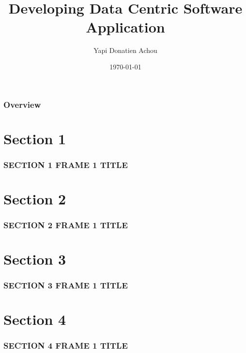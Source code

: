 \documentclass{beamer}
\title[Data management course, USN]{Developing Data Centric Software Application} %
\author{Yapi Donatien Achou} %
\institute[Semcon] %
{
Semcon \\ %
\medskip
\textit{yapi-donatien.achou@semcon.com} %
}
\date{\today} %
\begin{document}
\begin{frame}
\titlepage %
\end{frame}

\begin{frame}
\frametitle{Overview} %
\tableofcontents %
\end{frame}

\section{Section 1} 
\begin{frame}
\frametitle{SECTION 1 FRAME 1 TITLE}
\end{frame}




\section{Section 2}
\begin{frame}
\frametitle{SECTION 2 FRAME 1 TITLE}
\end{frame}




\section{Section 3}
\begin{frame}
\frametitle{SECTION 3 FRAME 1 TITLE}
\end{frame}




\section{Section 4}
\begin{frame}
\frametitle{SECTION 4 FRAME 1 TITLE}
\end{frame}
\end{document}
